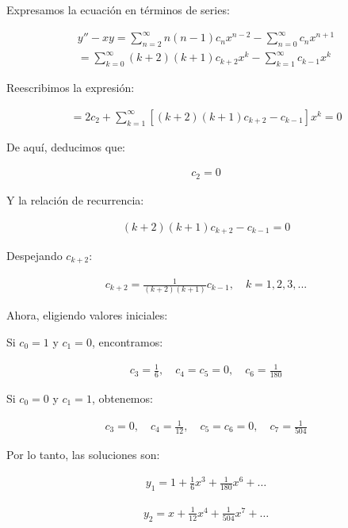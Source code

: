 Expresamos la ecuación en términos de series:

\begin{gather*}
y'' - xy = \sum _{n=2}^{\infty } n( n-1) c_{n} x^{n-2} -\sum _{n=0}^{\infty } c_{n} x^{n+1} \\
= \sum _{k=0}^{\infty }( k+2)( k+1) c_{k+2} x^{k} -\sum _{k=1}^{\infty } c_{k-1} x^{k}
\end{gather*}

Reescribimos la expresión:

\begin{gather*}
= 2c_{2} + \sum _{k=1}^{\infty }[( k+2)( k+1) c_{k+2} - c_{k-1}] x^{k} = 0
\end{gather*}

De aquí, deducimos que:

\begin{gather*}
c_{2} = 0
\end{gather*}

Y la relación de recurrencia:

\begin{gather*}
( k+2)( k+1) c_{k+2} - c_{k-1} = 0
\end{gather*}

Despejando \( c_{k+2} \):

\begin{gather*}
c_{k+2} = \frac{1}{( k+2)( k+1)} c_{k-1}, \quad k=1,2,3,...
\end{gather*}

Ahora, eligiendo valores iniciales:

Si \( c_0 = 1 \) y \( c_1 = 0 \), encontramos:

\begin{gather*}
c_{3} = \frac{1}{6}, \quad c_{4} = c_{5} = 0, \quad c_{6} = \frac{1}{180}
\end{gather*}

Si \( c_0 = 0 \) y \( c_1 = 1 \), obtenemos:

\begin{gather*}
c_{3} = 0, \quad c_{4} = \frac{1}{12}, \quad c_{5} = c_{6} = 0, \quad c_{7} = \frac{1}{504}
\end{gather*}

Por lo tanto, las soluciones son:

\begin{gather*}
y_{1} = 1 + \frac{1}{6} x^{3} + \frac{1}{180} x^{6} + \dots
\end{gather*}

\begin{gather*}
y_{2} = x + \frac{1}{12} x^{4} + \frac{1}{504} x^{7} + \dots
\end{gather*}



